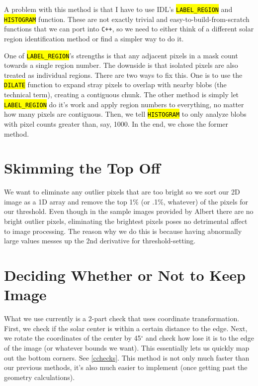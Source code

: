 \documentclass[10pt]{scrartcl}
\begin{document}
A problem with this method is that I have to use IDL's \hl{\texttt{LABEL\_REGION}} and \hl{\texttt{HISTOGRAM}} function. These are not exactly trivial and easy-to-build-from-scratch functions that we can port into \texttt{C++}, so we need to either think of a different solar region identification method or find a simpler way to do it. 

One of \hl{\texttt{LABEL\_REGION}}'s strengths is that any adjacent pixels in a mask count towards a single region number. The downside is that isolated pixels are also treated as individual regions. There are two ways to fix this. One is to use the \hl{\texttt{DILATE}} function to expand stray pixels to overlap with nearby blobs (the technical term), creating a contiguous chunk. The other method is simply let \hl{\texttt{LABEL\_REGION}} do it's work and apply region numbers to everything, no matter how many pixels are contiguous. Then, we tell \hl{\texttt{HISTOGRAM}} to only analyze blobs with pixel counts greater than, say, 1000. In the end, we chose the former method.


\clearpage

\section{Skimming the Top Off} %
\label{sec:skimming_the_top_off}
We want to eliminate any outlier pixels that are too bright so we sort our 2D image as a 1D array and remove the top 1\% (or .1\%, whatever) of the pixels for our threshold. Even though in the sample images provided by Albert there are no bright outlier pixels, eliminating the brightest pixels poses no detrimental affect to image processing. The reason why we do this is because having abnormally large values messes up the 2nd derivative for threshold-setting.

\section{Deciding Whether or Not to Keep Image} %
\label{sec:deciding_whether_or_not_to_keep_image}
What we use currently is a 2-part check that uses coordinate transformation. First, we check if the solar center is within a certain distance to the edge. Next, we rotate the coordinates of the center by 45$^\circ$ and check how lose it is to the edge of the image (or whatever bounds we want). This essentially lets us quickly map out the bottom corners. See \cref{cchecks}. This method is not only much faster than our previous methods, it's also much easier to implement (once getting past the geometry calculations). \\
\end{document}
